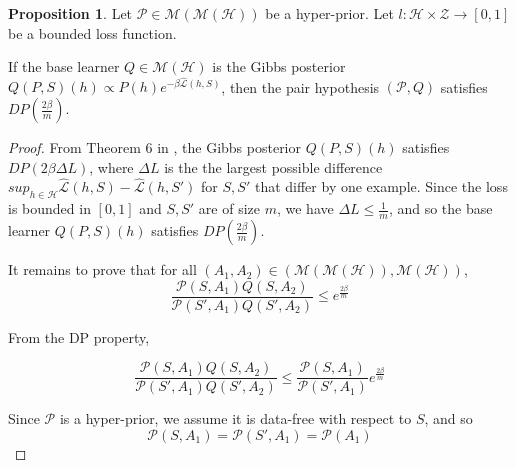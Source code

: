 \documentclass{article}
\theoremstyle{definition}
\newtheorem{proposition}{Proposition}[section]
\begin{document}
\begin{proposition} \label{thm:pair-is-dp-appendix}
	Let $\mathcal{P}\in \mathcal{M}(\mathcal{M}(\mathcal{H}))$ be a hyper-prior.
	Let $l:\mathcal{H}\times \mathcal{Z}\rightarrow [0,1]$ be a bounded loss function.
	
	If the base learner $Q\in \mathcal{M}(\mathcal{H})$ is the Gibbs posterior $Q(P, S)(h)\propto P(h)e^{-\beta\hat{\mathcal{L}}(h, S)}$, 
	then the pair hypothesis $(\mathcal{P}, Q)$ satisfies $DP\left (\frac{2\beta}{m}\right )$.
\end{proposition}

\begin{proof}
	From Theorem 6 in \citet{McSherry2007}, the Gibbs posterior $Q(P, S)(h)$ satisfies $DP\left (2\beta\Delta L\right )$, where $\Delta L$ is the the largest possible difference  $sup_{h\in\mathcal{H}}\hat{\mathcal{L}}(h,S)-\hat{\mathcal{L}}(h,S')$ for $S,S'$ that differ by one example. Since the loss is bounded in $[0,1]$ and $S,S'$ are of size $m$, we have $\Delta L\leq \frac{1}{m}$, and so the base learner $Q(P, S)(h)$ satisfies $DP\left (\frac{2\beta}{m}\right )$.
	
	
	It remains to prove that for all $(A_1,A_2)\in (\mathcal{M}(\mathcal{M}(\mathcal{H})), \mathcal{M}(\mathcal{H}))$, 
	$$ \frac{\mathcal{P}(S, A_1)Q(S,A_2)}{\mathcal{P}(S', A_1)Q(S',A_2)}\leq e^{\frac{2\beta}{m}}$$
	
	From the DP property, 
	
	$$ \frac{\mathcal{P}(S, A_1)Q(S,A_2)}{\mathcal{P}(S', A_1)Q(S',A_2)}\leq \frac{\mathcal{P}(S, A_1)}{\mathcal{P}(S', A_1)}e^{\frac{2\beta}{m}}$$
	
	Since $\mathcal{P}$ is a hyper-prior, we assume it is data-free with respect to $S$, and so 
	$$\mathcal{P}(S, A_1)=\mathcal{P}(S', A_1)=\mathcal{P}(A_1)$$
	
\end{proof}
\end{document}
